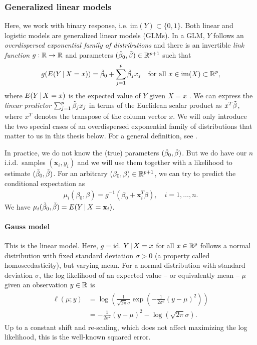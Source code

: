 \subsubsection{Generalized linear models}\label{subsubsec:glm}

Here, we work with binary response, i.e. $\mathrm{im}(Y) \subset \{0, 1\}$. Both 
linear and logistic models are generalized linear models (GLMs). In 
a GLM, $Y$ follows an \textit{overdispersed exponential family of distributions} and there is an 
invertible \textit{link function}
$g: \mathbb{R} \to \mathbb{R}$ and parameters $(\tilde{\beta}_0, \tilde{\beta}) \in \mathbb{R}^{p+1}$ such that
\begin{align}
    g(E(Y \,|\, X = x)) = \tilde{\beta}_0 + \sum_{j=1}^p \tilde{\beta}_j x_j \quad 
    \text{for all } x \in \mathrm{im}(X) \subset \mathbb{R}^p,
\end{align}
where $E(Y \,|\, X = x)$ is the expected value of $Y$ given $X = x$ \cite{glm72}. We can express the 
\textit{linear predictor} $\sum_{j=1}^p \tilde{\beta}_j x_j$ in terms of the Euclidean scalar product 
as $x^T \tilde{\beta}$, where $x^T$ denotes the transpose of the column vector $x$. We will only introduce 
the two special cases of an overdispersed exponential family of distributions that matter to us in 
this thesis below. For a general definition, see \cite[section 1.1]{glm72}.

In practice, we do not know the (true) parameters
$(\tilde{\beta}_0, \tilde{\beta})$. But we do have our $n$ i.i.d.\ samples $(\mathbf{x}_i, y_i)$
and we will use them together with a likelihood to estimate $(\tilde{\beta}_0, \tilde{\beta})$. For an 
arbitrary $(\beta_0, \beta) \in \mathbb{R}^{p+1}$, we can try to predict the conditional expectation as
\begin{align}\label{eq:glm-mu}
    \mu_i(\beta_0, \beta) = g^{-1}(\beta_0 + \mathbf{x}_i^T \beta), \quad i = 1, \ldots, n.
\end{align}
We have $\mu_i(\tilde{\beta}_0, \tilde{\beta}) = E(Y \,|\, X = \mathbf{x}_i)$.

\paragraph{Gauss model}
This is the linear model. Here, $g = \text{id}$. $Y \,|\, X = x$ for all $x \in \mathbb{R}^p$ follows a normal
distribution with fixed standard deviation $\sigma > 0$ (a property called homoscedasticity), but 
varying mean. For a normal distribution with standard deviation $\sigma$, the log likelihood of an 
expected value -- or equivalently mean -- $\mu$ given an observation $y \in \mathbb{R}$ is
\begin{align}
\begin{split}
    \ell(\mu; y) &= \log\left( \frac{1}{\sqrt{2\pi}\sigma} 
        \exp \left( -\frac{1}{2\sigma^2}(y - \mu)^2 \right) \right) \\
    &= -\frac{1}{2\sigma^2}(y - \mu)^2 - \log \left( \sqrt{2\pi}\sigma \right).
\end{split}
\end{align}
Up to a constant shift and re-scaling, which does not affect maximizing the log likelihood, this
is the well-known squared error.

